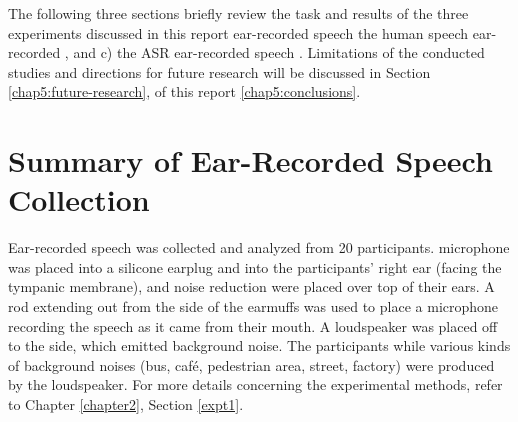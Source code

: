 \DIFdelend The following three sections briefly review the task and results of the three experiments discussed in this report \DIFdelbegin {}\DIFdelend \DIFaddbegin {}\DIFaddend ear-recorded speech \DIFdelbegin {}\DIFdelend \DIFaddbegin {}\DIFaddend the human speech \DIFdelbegin {}\DIFdelend \DIFaddbegin {}\DIFaddend ear-recorded \DIFdelbegin {}\DIFdelend \DIFaddbegin {}\DIFaddend , and c) the ASR \DIFdelbegin {}\DIFdelend \DIFaddbegin {}\DIFaddend ear-recorded speech \DIFdelbegin {}\DIFdelend \DIFaddbegin {}\DIFaddend .  Limitations of the conducted studies and directions for future research will be discussed in Section \ref{chap5:future-research}, \DIFdelbegin {}\DIFdelend \DIFaddbegin {}\DIFaddend of this report \DIFdelbegin {}\DIFdelend \DIFaddbegin {}\DIFaddend \ref{chap5:conclusions}.


\DIFdelbegin %
\DIFdelend \DIFaddbegin \section{Summary of Ear-Recorded Speech Collection}\DIFaddend \label{sec:chap2-review}

Ear-recorded speech was collected and analyzed from 20 participants.  \DIFdelbegin {}\DIFdelend \DIFaddbegin {}\DIFaddend microphone was placed into a silicone earplug and into the participants' right ear (facing the tympanic membrane), and noise reduction \DIFdelbegin {}\DIFdelend \DIFaddbegin {}\DIFaddend were placed over top of their ears.  A rod extending out from the side of the earmuffs was used to place a microphone recording the speech as it came from their mouth.  A loudspeaker was placed off to the side, which emitted background noise.  The participants \DIFdelbegin {}\DIFdelend \DIFaddbegin {}\DIFaddend while various kinds of background noises (bus, caf\'{e}, pedestrian area, street, factory) were produced by the loudspeaker.  For more details concerning the experimental methods, refer to Chapter \ref{chapter2}, Section \ref{expt1}.

